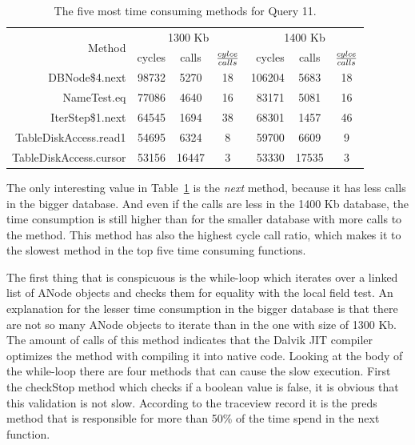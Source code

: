 \begin {table}[htpb] 
  \begin{center}
\begin {tabular} {|r|r|c|c|r|c|c|}
  	\hline
	\multirow{2}{*}{Method}&\multicolumn{3}{c}{1300 Kb}&\multicolumn{3}{|c|}{1400 Kb}\\
	\cline{2-7}
	&cycles&calls&${cylce \over calls}$&cycles&calls&${cylce \over calls}$\\
	\hline
	\hline
	DBNode\$4.next&98732&5270&18&106204&5683&18\\
	\hline
	NameTest.eq&77086&4640&16&83171&5081&16\\
	\hline
	IterStep\$1.next&64545&1694&38&68301&1457&46\\
	\hline
	TableDiskAccess.read1&54695&6324&8&59700&6609&9\\
	\hline
	TableDiskAccess.cursor&53156&16447&3&53330&17535&3\\
	\hline
\end {tabular}
\caption {The five most time consuming methods for Query 11.}
\label {tab:traceview-q11-methods}
\end{center}
\end {table}

The only interesting value in Table~\ref{tab:traceview-q11-methods} is the \textit{next} method, because it has less calls in the bigger database.
And even if the calls are less in the 1400 Kb database, the time consumption is still higher than for the smaller database with more calls to the method.
This method has also the highest cycle call ratio, which makes it to the slowest method in the top five time consuming functions.

The first thing that is conspicuous is the while-loop which iterates over a linked list of \textsf{ANode} objects and checks them for equality with the local field \textsf{test}.
An explanation for the lesser time consumption in the bigger database is that there are not so many \textsf{ANode} objects to iterate than in the one with size of 1300 Kb. 
The amount of calls of this method indicates that the Dalvik JIT compiler optimizes the method with compiling it into native code.
Looking at the body of the while-loop there are four methods that can cause the slow execution.
First the \textsf{checkStop} method which checks if a boolean value is false, it is obvious that this validation is not slow.
According to the traceview record it is the \textsf{preds} method that is responsible for more than 50\% of the time spend in the \textsf{next} function.

